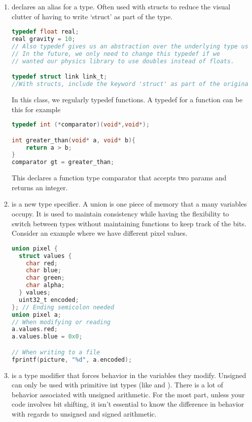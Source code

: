 \begin{enumerate}
	    \item {} declares an alias for a type.
        Often used with structs to reduce the visual clutter of having to write `struct' as part of the type.

	      \begin{lstlisting}[language=C]
typedef float real;
real gravity = 10;
// Also typedef gives us an abstraction over the underlying type used.
// In the future, we only need to change this typedef if we
// wanted our physics library to use doubles instead of floats.

typedef struct link link_t;
//With structs, include the keyword 'struct' as part of the original types
\end{lstlisting}

	      In this class, we regularly typedef functions.
        A typedef for a function can be this for example

	      \begin{lstlisting}[language=C]
typedef int (*comparator)(void*,void*);

int greater_than(void* a, void* b){
    return a > b;
}
comparator gt = greater_than;
\end{lstlisting}

	      This declares a function type comparator that accepts two  params and returns an integer.

	    \item {} is a new type specifier.
        A union is one piece of memory that a many variables occupy.
        It is used to maintain consistency while having the flexibility to switch between types without maintaining functions to keep track of the bits.
        Consider an example where we have different pixel values.
	      \begin{lstlisting}[language=C]
union pixel {
  struct values {
    char red;
    char blue;
    char green;
    char alpha;
  } values;
  uint32_t encoded;
}; // Ending semicolon needed
union pixel a;
// When modifying or reading
a.values.red;
a.values.blue = 0x0;

// When writing to a file
fprintf(picture, "%d", a.encoded);
\end{lstlisting}
	    \item {} is a type modifier that forces  behavior in the variables they modify.
        Unsigned can only be used with primitive int types (like  and ).
        There is a lot of behavior associated with unsigned arithmetic. For the most part, unless your code involves bit shifting, it isn't essential to know the difference in behavior with regards to unsigned and signed arithmetic.


\end{enumerate}
